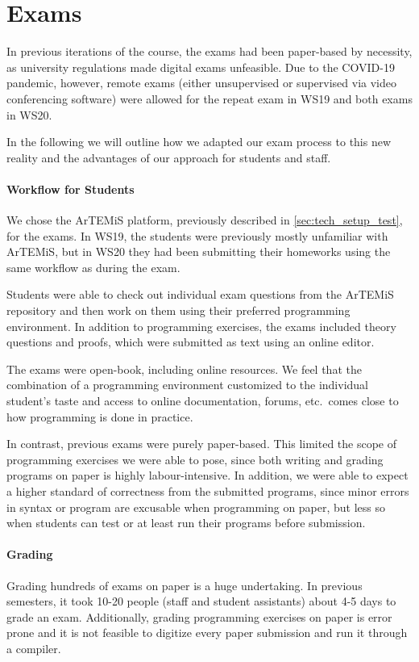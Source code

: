 \section{Exams}\label{sec:exam}
In previous iterations of the course, the exams had been paper-based by necessity, as university regulations made digital exams unfeasible. Due to the COVID-19 pandemic, however, remote exams (either unsupervised or supervised via video conferencing software) were allowed for the repeat exam in WS19 and both exams in WS20.

In the following we will outline how we adapted our exam process to this new reality and the advantages of our approach for students and staff.

\paragraph{Workflow for Students}

We chose the ArTEMiS \cite{artemis} platform, previously described in \cref{sec:tech_setup_test}, for the exams. In WS19, the students were previously mostly unfamiliar with ArTEMiS, but in WS20 they had been submitting their homeworks using the same workflow as during the exam.

Students were able to check out individual exam questions from the ArTEMiS repository and then work on them using their preferred programming environment. In addition to programming exercises, the exams included theory questions and proofs, which were submitted as text using an online editor.

The exams were open-book, including online resources. We feel that the combination of a programming environment customized to the individual student's taste and access to online documentation, forums, etc.~comes close to how programming is done in practice.

In contrast, previous exams were purely paper-based. This limited the scope of programming exercises we were able to pose, since both writing and grading programs on paper is highly labour-intensive. In addition, we were able to expect a higher standard of correctness from the submitted programs, since minor errors in syntax or program are excusable when programming on paper, but less so when students can test or at least run their programs before submission.

\paragraph{Grading}
Grading hundreds of exams on paper is a huge undertaking. In previous semesters, it took 10-20 people (staff and student assistants) about 4-5 days to grade an exam. Additionally, grading programming exercises on paper is error prone and it is not feasible to digitize every paper submission and run it through a compiler.

